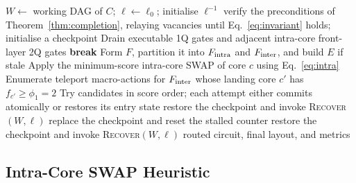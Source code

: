 \documentclass[journal]{IEEEtran}
\newcommand{\dSABRE}{d\textsc{sabre}}
\begin{document}
\begin{algorithm}[t]
\caption{\dSABRE{} \texttt{route}$(C,\ell_0)$.  An empty legal candidate set goes straight to recovery rather than waiting out the stall window, since no local SWAP can create headroom in a neighbouring core.  \textsc{Recover} is the transaction of Section~\ref{sec:recovery}.}
\label{alg:dsabre}
\begin{algorithmic}[1]
\STATE $W\leftarrow$ working DAG of $C$; $\ell\leftarrow\ell_0$; initialise $\ell^{-1}$
\STATE verify the preconditions of Theorem~\ref{thm:completion}, relaying vacancies until Eq.~\eqref{eq:invariant} holds; initialise a checkpoint\label{ln:pre}
  \STATE Drain executable 1Q gates and adjacent intra-core front-layer 2Q gates
   \STATE \textbf{break} \ENDIF
  \STATE Form $F$, partition it into $F_{\rm intra}$ and $F_{\rm inter}$, and build $E$ if stale
      \STATE Apply the minimum-score intra-core SWAP of core $c$ using Eq.~\eqref{eq:intra}
    \ENDFOR
  \ELSE
    \STATE Enumerate teleport macro-actions for $F_{\rm inter}$ whose landing core $c'$ has $f_{c'}\ge\phi_1=2$
    \STATE Try candidates in score order; each attempt either commits atomically or restores its entry state
      \STATE restore the checkpoint and invoke \textsc{Recover}$(W,\ell)$
    \ENDIF
  \ENDIF
    \STATE replace the checkpoint and reset the stalled counter
    \STATE restore the checkpoint and invoke \textsc{Recover}$(W,\ell)$
  \ENDIF
\ENDWHILE
\RETURN routed circuit, final layout, and metrics
\end{algorithmic}
\end{algorithm}

\subsection{Intra-Core SWAP Heuristic}
\label{sec:intra}
\end{document}
